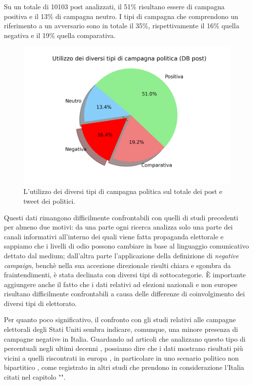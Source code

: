 Su un totale di 10103 post analizzati, il 51\% risultano essere di campagna positiva e il 13\% di campagna neutro. I tipi di campagna che comprendono un riferimento a un avversario sono in totale il 35\%, rispettivamente il 16\% quella negativa e il 19\% quella comparativa.
\begin{figure}
	\includegraphics[width=\textwidth]{figures/tipoDiCampagnapie}
	\caption{L'utilizzo dei diversi tipi di campagna politica sul totale dei post e tweet dei politici.}
	\label{fig:campagna}
\end{figure}

Questi dati rimangono difficilmente confrontabili con quelli di studi precedenti per almeno due motivi: da una parte ogni ricerca analizza solo una parte dei canali informativi all'interno dei quali viene fatta propaganda elettorale e sappiamo che i livelli di odio possono cambiare in base al linguaggio comunicativo dettato dal medium; dall'altra parte l'applicazione della definizione di \textit{negative campaign}, benchè nella sua accezione direzionale risulti chiara e sgombra da fraintendimenti, è stata declinata con diversi tipi di sottocategorie. È importante aggiungere anche il fatto che i dati relativi ad elezioni nazionali e non europee risultano difficilmente confrontabili a causa delle differenze di coinvolgimento dei diversi tipi di elettorato.

Per quanto poco significativo, il confronto con gli studi relativi alle campagne elettorali degli Stati Uniti sembra indicare, comunque, una minore presenza di campagne negative in Italia. Guardando ad articoli che analizzano questo tipo di percentuali negli ultimi decenni \citep{geer2012} \citep{druckman2010} \citep{media2018}, possiamo dire che i dati mostrano risultati più vicini a quelli riscontrati in europa \citep{walter2014}, in particolare in uno scenario politico non bipartitico \citep{papp2018}, come registrato in altri studi che prendono in considerazione l’Italia \citep{ceron2016} \citep{seddone2019} citati nel capitolo "".

